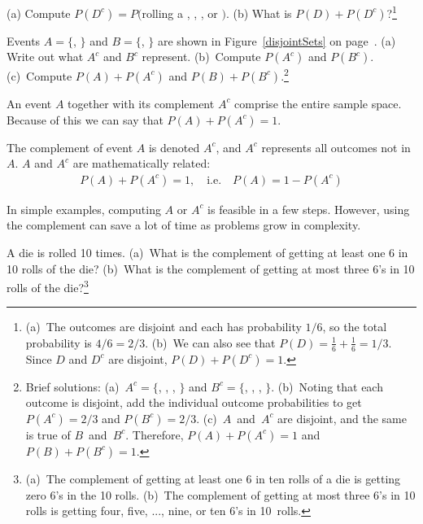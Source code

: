 \begin{exercise}
(a) Compute $P(D^c) = P($rolling a , , , or $)$. (b) What is $P(D) + P(D^c)$?\footnote{(a)~The outcomes are disjoint and each has probability $1/6$, so the total probability is $4/6=2/3$. (b)~We can also see that $P(D)=\frac{1}{6} + \frac{1}{6} = 1/3$. Since $D$ and $D^c$ are disjoint, $P(D) + P(D^c) = 1$.}
\end{exercise}

\begin{exercise}
Events $A=\{$, $\}$ and $B=\{$, $\}$ are shown in Figure~\ref{disjointSets} on page~\pageref{disjointSets}. (a) Write out what $A^c$ and $B^c$ represent. (b)~Compute $P(A^c)$ and $P(B^c)$. (c)~Compute $P(A)+P(A^c)$ and $P(B)+P(B^c)$.\footnote{Brief solutions: (a)~$A^c=\{$, , , $\}$ and $B^c=\{$, , , $\}$. (b)~Noting that each outcome is disjoint, add the individual outcome probabilities to get $P(A^c)=2/3$ and $P(B^c)=2/3$. (c)~$A$~and~$A^c$ are disjoint, and the same is true of $B$~and~$B^c$. Therefore, $P(A) + P(A^c) = 1$ and $P(B) + P(B^c) = 1$.}
\end{exercise}

An event $A$ together with its complement $A^c$ comprise the entire sample space. Because of this we can say that $P(A) + P(A^c) = 1$.

\begin{termBox}{
The complement of event $A$ is denoted $A^c$, and $A^c$ represents all outcomes not in~$A$. $A$ and $A^c$ are mathematically related: \vspace{-2mm}
\begin{eqnarray}\label{complement}
P(A) + P(A^c) = 1, \quad\text{i.e.}\quad P(A) = 1-P(A^c)
\end{eqnarray}\vspace{-6.5mm}}
\end{termBox}

In simple examples, computing $A$ or $A^c$ is feasible in a few steps. However, using the complement can save a lot of time as problems grow in complexity.

\begin{exercise}
A die is rolled 10 times. (a)~What is the complement of getting at least one 6 in 10 rolls of the die? (b)~What is the complement of getting at most three 6's in 10 rolls of the die?\footnote{(a)~The complement of getting at least one 6 in ten rolls of a die is getting zero 6's in the 10 rolls. (b)~The complement of getting at most three 6's in 10 rolls is getting four, five, ..., nine, or ten 6's in 10~rolls.}
\end{exercise}

